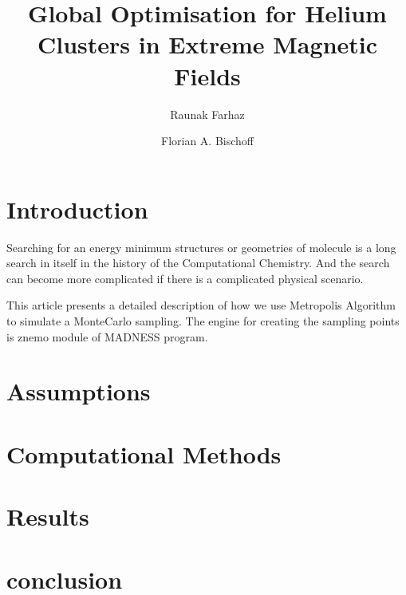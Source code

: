 \documentclass[a4paper,10pt]{article}
\title{Global Optimisation for Helium Clusters in Extreme Magnetic Fields}
\author[1]{Raunak Farhaz}
\author[1]{Florian A. Bischoff}
\affil[1]{Institut f\"ur Chemie, Humboldt Universit\"at zu Berlin}
\begin{document}
\maketitle

\begin{abstract}

\end{abstract}

\section{Introduction}
Searching for an energy minimum structures or geometries of molecule is a long search in itself in the history of the Computational Chemistry. And the search can become more complicated if there is a complicated physical scenario.

This article presents a detailed description of how we use Metropolis Algorithm to simulate a MonteCarlo sampling. The engine for creating the sampling points is znemo module of MADNESS program.

\section{Assumptions}


\section{Computational Methods}


\section{Results}

\section{conclusion}
\end{document}
